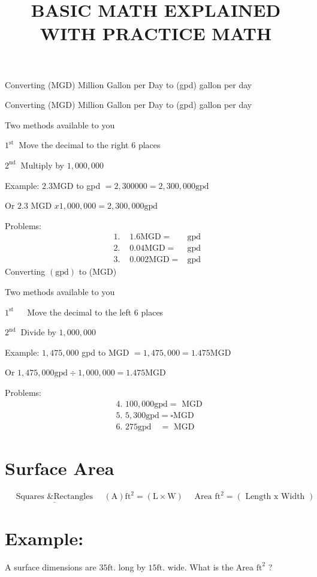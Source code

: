 \documentclass[10pt]{article}
\title{BASIC MATH EXPLAINED WITH PRACTICE MATH }
\author{}
\date{}
\begin{document}
\maketitle
Converting (MGD) Million Gallon per Day to (gpd) gallon per day

Converting (MGD) Million Gallon per Day to (gpd) gallon per day

Two methods available to you

$1^{\text {st }}$ Move the decimal to the right 6 places

$2^{\text {nd }}$ Multiply by $1,000,000$

Example: $2.3 \mathrm{MGD}$ to gpd $=2,300000=2,300,000 \mathrm{gpd}$

Or $2.3$ MGD $x 1,000,000=2,300,000 \mathrm{gpd}$

Problems:
$$
\begin{array}{lll}
\text { 1. } & 1.6 \mathrm{MGD}= & \mathrm{gpd} \\
\text { 2. } & 0.04 \mathrm{MGD}= & \mathrm{gpd} \\
\text { 3. } & 0.002 \mathrm{MGD}= & \mathrm{gpd}
\end{array}
$$
Converting $(\mathrm{gpd})$ to (MGD)

Two methods available to you

$1^{\text {st }} \quad$ Move the decimal to the left 6 places

$2^{\text {nd }}$ Divide by $1,000,000$

Example: $1,475,000$ gpd to MGD $=1,475,000=1.475 \mathrm{MGD}$

Or $1,475,000 \mathrm{gpd} \div 1,000,000=1.475 \mathrm{MGD}$

Problems:
$$
\begin{aligned}
& \text { 4. } 100,000 \mathrm{gpd}=\text { MGD } \\
& \text { 5. } 5,300 \mathrm{gpd}=\square \mathrm{MGD} \\
& \text { 6. } 275 \mathrm{gpd} \quad=\text { MGD }
\end{aligned}
$$

\section{Surface Area}
$$
\quad \underline{\text { Squares \& Rectangles }} \quad(\mathrm{A}) \mathrm{ft}^{2}=(\mathrm{L} \times \mathrm{W}) \quad \text { Area } \mathrm{ft}^{2}=(\text { Length } \mathrm{x} \text { Width })
$$

\section{Example:}
A surface dimensions are $35 \mathrm{ft}$. long by $15 \mathrm{ft}$. wide. What is the Area $\mathrm{ft}^{2}$ ?
\end{document}
